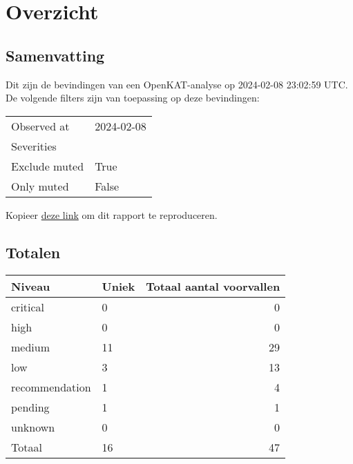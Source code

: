 \documentclass[11pt, a4paper]{report}
\begin{document}
\newpage

\chapter{Overzicht}

\section{Samenvatting}
Dit zijn de bevindingen van een OpenKAT-analyse op 2024-02-08 23:02:59 UTC. %
De volgende filters zijn van toepassing op deze bevindingen:

\begin{longtable}{ p{}  p{} }

            Observed at & 2024{-}02{-}08 \\

            Severities &  \\

            Exclude muted & True \\

            Only muted & False \\

\end{longtable}



    \noindent Kopieer \href{http://localhost:8000/nl/_rieven/findings/?observed_at=2024-02-08}{deze link} om dit rapport te reproduceren.



\bgroup{}
\def\arraystretch{1.2}
\section{Totalen}
\begin{tabular}{ llr }
	Niveau & Uniek & Totaal aantal voorvallen \\\toprule
	\toprule

		\colorbox{box-color-critical}{ \color{color-critical} critical } & 0 & 0 \\

		\colorbox{box-color-high}{ \color{color-high} high } & 0 & 0 \\

		\colorbox{box-color-medium}{ \color{color-medium} medium } & 11 & 29 \\

		\colorbox{box-color-low}{ \color{color-low} low } & 3 & 13 \\

		\colorbox{box-color-recommendation}{ \color{color-recommendation} recommendation } & 1 & 4 \\

		\colorbox{box-color-pending}{ \color{color-pending} pending } & 1 & 1 \\

		\colorbox{box-color-unknown}{ \color{color-unknown} unknown } & 0 & 0 \\

	\bottomrule
	Totaal & 16 & 47
\end{tabular}
\egroup{}
\end{document}
